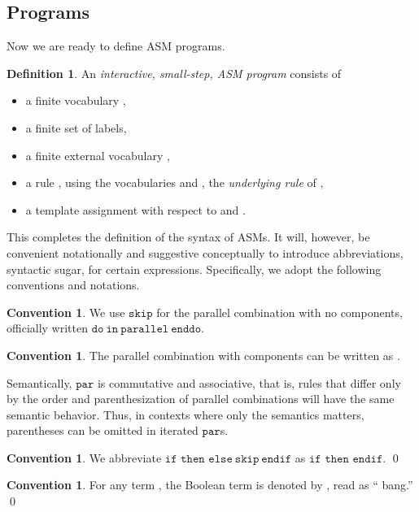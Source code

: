 \documentclass{LMCS}
\theoremstyle{definition}
\newtheorem{df}[thm]{Definition}
\newtheorem{conn}[thm]{Convention}
\newenvironment{ls}{\begin{itemize}}{\end{itemize}}
\newcommand{\ttt}[1]{\ensuremath{\mathtt {#1}}}
\begin{document}
\subsection{Programs} \label{sugar}

Now we are ready to define ASM programs.

\begin{df}   \label{asm-prog-def}
  An \emph{interactive, small-step, ASM program}  consists of
  \begin{ls}
    \item a finite vocabulary ,
    \item a finite set  of labels,
    \item a finite external vocabulary ,
    \item a rule , using the vocabularies  and
    , the \emph{underlying rule} of ,
    \item a template assignment with respect to  and .
  \end{ls}
\end{df}

This completes the definition of the syntax of ASMs.  It will, however, be
convenient notationally and suggestive conceptually to introduce
abbreviations, syntactic sugar, for certain expressions.  Specifically, we
adopt the following conventions and notations.



\begin{conn}
  We use \ttt{skip} for the parallel combination with no components,
  officially written \ttt{do\ in\ parallel\ enddo}.
\end{conn}

\begin{conn}
The parallel combination with  components  can
     be written as .
\end{conn}

Semantically, \ttt{par} is commutative and associative, that is, rules
that differ only by the order and parenthesization of parallel
combinations will have the same semantic behavior.  Thus, in contexts
where only the semantics matters, parentheses can be omitted in
iterated \ttt{par}s.

\begin{conn}
  We abbreviate \ttt{if}  \ttt{then}  \ttt{else\ skip\ endif}
  as \ttt{if}  \ttt{then}  \ttt{endif}.
\qed\end{conn}

\begin{conn}
  For any term , the Boolean term  is denoted by , read as
  `` bang.''
\qed\end{conn}
\end{document}
